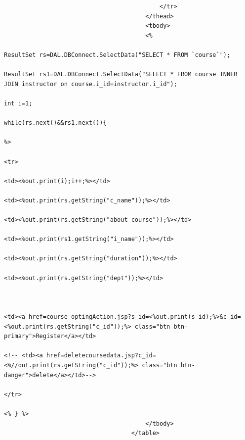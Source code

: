 \begin{verbatim}
											</tr>
										</thead>
										<tbody>
										<%
                                                                                    ResultSet rs=DAL.DBConnect.SelectData("SELECT * FROM `course`");
                                                                                    ResultSet rs1=DAL.DBConnect.SelectData("SELECT * FROM course INNER JOIN instructor on course.i_id=instructor.i_id");
                                                                                    int i=1;
                                                                                            while(rs.next()&&rs1.next()){
                                                                                    %>
                                                                                    <tr>
                                                                                        <td><%out.print(i);i++;%></td>
                                                                                        <td><%out.print(rs.getString("c_name"));%></td>
                                                                                        <td><%out.print(rs.getString("about_course"));%></td>
                                                                                        <td><%out.print(rs1.getString("i_name"));%></td>
                                                                                        <td><%out.print(rs.getString("duration"));%></td>
                                                                                        <td><%out.print(rs.getString("dept"));%></td>
                                                                                            
                                                                                             
                                                                                             <td><a href=course_optingAction.jsp?s_id=<%out.print(s_id);%>&c_id=<%out.print(rs.getString("c_id"));%> class="btn btn-primary">Register</a></td>
                                                                                            <!-- <td><a href=deletecoursedata.jsp?c_id=<%//out.print(rs.getString("c_id"));%> class="btn btn-danger">delete</a></td>-->
                                                                                    </tr>
                                                                                    <% } %>
										</tbody>
									</table>     
                                                                                	

\end{verbatim}
